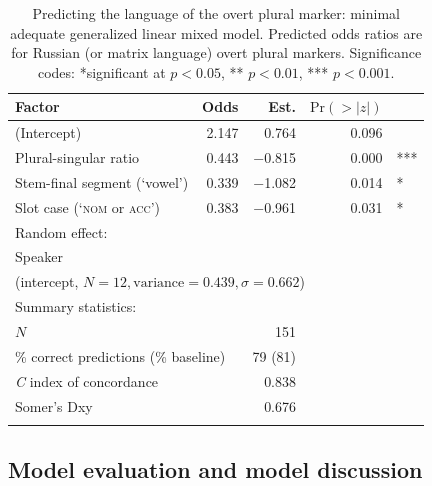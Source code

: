 \begin{table}
		\begin{tabular}{l rrr l}
		 \lsptoprule
	     Factor & Odds & Est. & $\text{Pr}(>|z|)$ & \\\midrule
		(Intercept) & 2.147 & 0.764  & 0.096 & \\
			Plural-singular ratio & 0.443 & −0.815 & 0.000 & ***\\
			Stem-final segment (`vowel') & 0.339 & −1.082 & 0.014 & *\\ 
			Slot case (`\textsc{nom} or \textsc{acc}') & 0.383 & −0.961 & 0.031 & *\\\midrule
			\multicolumn{5}{l}{Random effect:}\\
			\multicolumn{5}{l}{Speaker}\\
			\multicolumn{5}{l}{(intercept, $N = 12, \text{variance} = 0.439, \sigma = 0.662$)}\\\midrule
			\multicolumn{2}{l}{Summary statistics:}\\
			\multicolumn{2}{l}{$N$} & 151 &\\
			\multicolumn{2}{l}{\% correct predictions (\% baseline)} & 79 (81) &\\
			\multicolumn{2}{l}{\textit{C} index of concordance} & 0.838 & \\
			\multicolumn{2}{l}{Somer's Dxy}  & 0.676 & \\
			\lspbottomrule
		\end{tabular}
	\caption{Predicting the language of the overt plural marker: minimal adequate generalized linear mixed model. Predicted odds ratios are for Russian (or matrix language) overt plural markers. Significance codes: *significant at $p < 0.05$, ** $p < 0.01$, *** $p < 0.001$.}
\label{tab:6:6}
\end{table}

\subsection{Model evaluation and model discussion}

